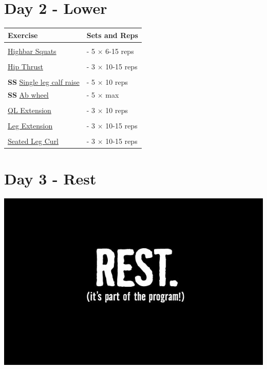 \documentclass[11pt]{article}
\begin{document}
\section*{Day 2 - Lower}
\begin{center}
\begin{tabular}{|l|l|}
\hline
\textbf{Exercise} & \textbf{Sets and Reps}\\
\hline
&\\
\href{https://www.youtube.com/watch?v=zoZWgTrZLd8}{Highbar Squats} & - 5 $\times$ 6-15 reps \\
\hline
&\\
\href {https://www.youtube.com/watch?v=Zp26q4BY5HE}{Hip Thrust } & - 3 $\times$  10-15 reps \\
\hline
&\\
\textbf{SS} \href{https://www.youtube.com/watch?v=DlcI-MK6jAA}{Single leg calf raise} & - 5 $\times$ 10 reps \\
\textbf{SS} \href{https://www.youtube.com/shorts/7GNGzZiyDhE}{Ab wheel} &-  5 $\times$ max \\
\hline
&\\
\href{https://www.youtube.com/shorts/MVu18rxmukk}{QL Extension} & - 3 $\times$ 10 reps \\
\hline
&\\
\href{https://www.youtube.com/watch?v=swZQC689o9U}{Leg Extension} & - 3 $\times$ 10-15 reps \\
\hline
&\\
\href{https://www.youtube.com/watch?v=oFxEDkppbSQ}{Seated Leg Curl} & - 3 $\times$ 10-15 reps \\
\hline
\end{tabular}
\end{center}

\section*{Day 3 - Rest}
\includegraphics[width=\textwidth]{rest.jpg}
\end{document}
